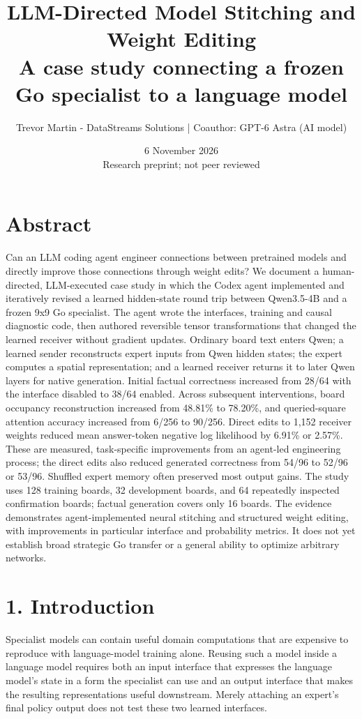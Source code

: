 \documentclass[11pt]{article}
\newcommand{\draftnotice}{Research preprint; not peer reviewed}
\begin{document}
\title{LLM-Directed Model Stitching and Weight Editing\\[6pt]\large A case study connecting a frozen Go specialist to a language model}
\author{Trevor Martin - DataStreams Solutions | Coauthor: GPT-6 Astra (AI model)}
\date{6 November 2026\\\small\draftnotice}
\maketitle
\section*{Abstract}
Can an LLM coding agent engineer connections between pretrained models and directly improve those connections through weight edits? We document a human-directed, LLM-executed case study in which the Codex agent implemented and iteratively revised a learned hidden-state round trip between Qwen3.5-4B and a frozen 9x9 Go specialist. The agent wrote the interfaces, training and causal diagnostic code, then authored reversible tensor transformations that changed the learned receiver without gradient updates. Ordinary board text enters Qwen; a learned sender reconstructs expert inputs from Qwen hidden states; the expert computes a spatial representation; and a learned receiver returns it to later Qwen layers for native generation. Initial factual correctness increased from 28/64 with the interface disabled to 38/64 enabled. Across subsequent interventions, board occupancy reconstruction increased from 48.81\% to 78.20\%, and queried-square attention accuracy increased from 6/256 to 90/256. Direct edits to 1,152 receiver weights reduced mean answer-token negative log likelihood by 6.91\% or 2.57\%. These are measured, task-specific improvements from an agent-led engineering process; the direct edits also reduced generated correctness from 54/96 to 52/96 or 53/96. Shuffled expert memory often preserved most output gains. The study uses 128 training boards, 32 development boards, and 64 repeatedly inspected confirmation boards; factual generation covers only 16 boards. The evidence demonstrates agent-implemented neural stitching and structured weight editing, with improvements in particular interface and probability metrics. It does not yet establish broad strategic Go transfer or a general ability to optimize arbitrary networks.

\section*{1. Introduction}
Specialist models can contain useful domain computations that are expensive to reproduce with language-model training alone. Reusing such a model inside a language model requires both an input interface that expresses the language model's state in a form the specialist can use and an output interface that makes the resulting representations useful downstream. Merely attaching an expert's final policy output does not test these two learned interfaces.
\end{document}
